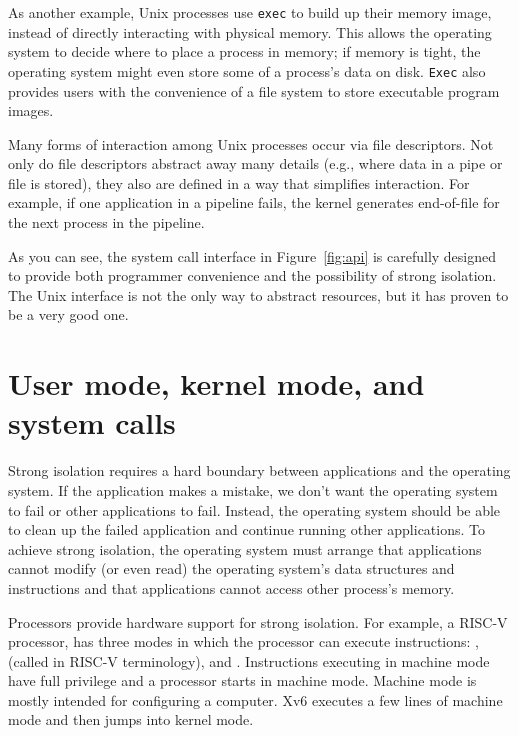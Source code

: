 As another example, Unix processes use 
\lstinline{exec}
to build up their memory image, instead of directly interacting with physical
memory.  This allows the operating system to decide where to place a process in
memory; if memory is tight, the operating system might even store some of
a process's data on disk.
\lstinline{Exec}
also provides
users with the convenience of a file system to store executable program images.  

Many forms of interaction among Unix processes occur via file descriptors.
Not only do file descriptors abstract away many details (e.g.,
where data in a pipe or file is stored), they also are defined in a
way that simplifies interaction.
For example, if one application in a pipeline fails, the kernel
generates end-of-file for the next process in the pipeline.

As you can see, the system call interface in
Figure~\ref{fig:api}
is carefully designed to provide both programmer convenience and
the possibility of strong isolation.  The Unix interface
is not the only way to abstract resources, but it has proven to be a very good
one.

\section{User mode, kernel mode, and system calls}

Strong isolation requires a hard boundary between applications and the operating
system.  If the application makes a mistake, we don't want the operating system
to fail or other applications to fail. Instead, the operating system should be
able to clean up the failed application and continue running other applications.
To achieve strong isolation, the operating system must arrange that applications cannot modify (or even
read) the operating system's data structures and instructions and that
applications cannot access other process's memory.

Processors provide hardware support for strong isolation.   For
example, a RISC-V processor, has three modes in which
the processor can execute instructions:
,
(called
in RISC-V terminology), and
.
Instructions executing in machine mode have full privilege and a
processor starts in machine mode.  Machine mode is mostly intended for
configuring a computer.  Xv6 executes a few lines of machine mode and
then jumps into kernel mode.

